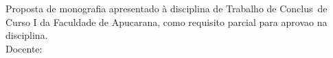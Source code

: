 
\begin{titlepage}
\label{tcc:rosto}
  \begin{center}
    \Large{\AUTOR}\\[10cm]
    \Large{\textbf{\TITULO}}\\[2cm]
    \hspace{.45\textwidth} %
    \begin{minipage}{.5\textwidth}
      \begin{normalsize}
        Proposta de monografia apresentado \`a disciplina de Trabalho de Conclus\ao\ de Curso I da Faculdade de Apucarana, como requisito parcial para aprova\ca o na disciplina.\\[1.5cm]
        Docente: \Orientador
      \end{normalsize}
    \end{minipage}
    \vfill

    \begin{normalsize}
      \Local\\
      \Data
    \end{normalsize}
  \end{center}
\end{titlepage}
